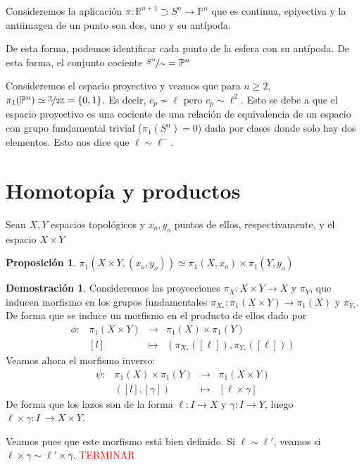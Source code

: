 \documentclass[12pt,twoside]{report}
\theoremstyle{azul}
\theoremstyle{azul2}
\theoremstyle{plain}
\newtheorem*{prop}{Proposición}
\theoremstyle{definition}
\newtheorem*{dem}{Demostración}
\theoremstyle{remark}
\begin{document}
Consideremos la aplicación 
$\pi: \mathbb{R}^{n+1} \supset S^n \longrightarrow \mathbb{P}^n$ que es continua, epiyectiva y la antiimagen de un punto son dos, uno y su antípoda. 

De esta forma, podemos identificar cada punto de la esfera con su antípoda. De esta forma, el conjunto cociente $\nicefrac{S^n}{\sim}=\mathbb{P}^n$ 

Consideremos el espacio proyectivo y veamos que para $n \geq 2$, $\mathlarger{\pi}_1(\mathbb{P}^n)\simeq \nicefrac{\mathbb{Z}}{2 \mathbb{Z}}=\{0,1\}$. Es decir, $c_p \nsim \ell $ pero $c_p \sim \ell^2$.
Esto se debe a que el espacio proyectivo es una cociente de una relación de equivalencia de un espacio con grupo fundamental trivial ($\pi_1(S^n)=0$) dada por clases donde solo hay dos elementos. Esto nos dice que $\ell \sim \ell^-$. 
\section{Homotopía y productos}
Sean $X,Y$ espacios topológicos y $x_o,y_o$ puntos de ellos, respectivamente, y el espacio $X \times Y$
\begin{prop}
    $\pi_1(X \times Y, (x_o,y_o)) \simeq \pi_1(X,x_o) \times \pi_1(Y,y_o)$
\end{prop}
\begin{dem}
    Consideremos las proyecciones $\pi_X:X \times Y \longrightarrow X$ y $\pi_Y$, que inducen morfismo en los grupos fundamentales $\pi_{X_*}: \pi_1(X\times Y)\longrightarrow\pi_1(X)$ y $\pi_{Y_*}$. De forma que se induce un morfismo en el producto de ellos dado por 
    $$\begin{array}{rrcl}
         \phi:& \pi_1(X\times Y) & \longrightarrow & \pi_1(X) \times \pi_1(Y)\\
         & [ l ] & \longmapsto & (\pi_{X_*}([ \ell ]), \pi_{Y_*}([\ell])) 
    \end{array}$$
    Veamos ahora el morfismo inverso:
    $$\begin{array}{rrcl}
         \psi: & \pi_1(X) \times \pi_1(Y)  & \longrightarrow & \pi_1(X\times Y)  \\
         & ([ l ], [\gamma]) & \longmapsto & [\ell \times \gamma]
    \end{array}$$
    De forma que los lazos son de la forma $\ell: I \longrightarrow X$ y $\gamma: I \longrightarrow Y$, luego $\ell \times \gamma: I \ \longrightarrow X \times Y$. 

    Veamos pues que este morfismo está bien definido. Si $\ell \sim \ell'$, veamos si $\ell \times \gamma \sim \ell' \times \gamma$. \textcolor{red}{TERMINAR}
\end{dem}
\end{document}
